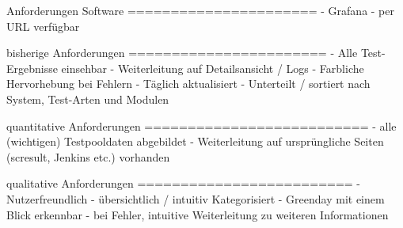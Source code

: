 Anforderungen Software
======================
- Grafana
- per URL verfügbar

bisherige Anforderungen
=======================
- Alle Test-Ergebnisse einsehbar
- Weiterleitung auf Detailsansicht / Logs
- Farbliche Hervorhebung bei Fehlern
- Täglich aktualisiert
- Unterteilt / sortiert nach System, Test-Arten und Modulen

quantitative Anforderungen
==========================
- alle (wichtigen) Testpooldaten abgebildet
- Weiterleitung auf ursprüngliche Seiten (scresult, Jenkins etc.) vorhanden

qualitative Anforderungen
=========================
- Nutzerfreundlich
- übersichtlich / intuitiv Kategorisiert
- Greenday mit einem Blick erkennbar
- bei Fehler, intuitive Weiterleitung zu weiteren Informationen
